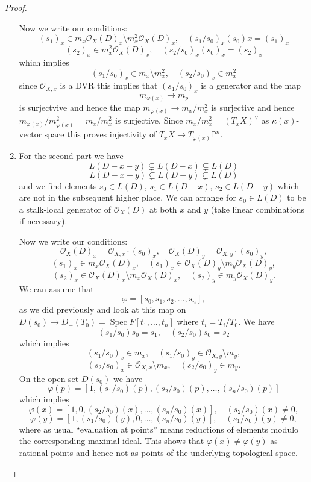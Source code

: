 \documentclass[12pt]{article}
\numberwithin{equation}{section}
\theoremstyle{definition}
\theoremstyle{remark}
\newcommand{\Ocal}{\mathcal{O}}
\newcommand{\PP}{\mathbb{P}}
\newcommand{\Spec}{\operatorname{Spec}}
\begin{document}
\begin{proof}
\begin{enumerate}
Now we write our conditions:
$$ (s_1)_x \in m_x \Ocal_X(D)_x\setminus m_x^2 \Ocal_X(D)_x, \quad (s_1/s_0)_x (s_0)x = (s_1)_x $$
$$ (s_2)_x \in m_x^2 \Ocal_X(D)_x, \quad (s_2/s_0)_x (s_0)_x = (s_2)_x $$
which implies 
 $$ (s_1/s_0)_x \in m_x\setminus m_x^2, \quad (s_2/s_0)_x \in m_x^2 $$
since $\Ocal_{X,x}$ is a DVR this implies that $(s_1/s_0)_x$ is a generator and the map 
 $$ m_{\varphi(x)} \to m_p $$
is surjectvive and hence the map $m_{\varphi(x)} \to m_x/m_x^2$ is surjective and hence $m_{\varphi(x)}/m_{\varphi(x)}^2 = m_x/m_x^2$ is surjective.
Since $m_x/m_x^2 = (T_xX)^{\vee}$ as $\kappa(x)$-vector space this proves injectivity of $T_xX \to T_{\varphi(x)}\PP^n$.
\item For the second part we have 
 $$ L(D-x-y) \subsetneq L(D-x) \subsetneq L(D) $$
 $$L(D-x-y) \subsetneq L(D-y) \subsetneq L(D) $$
 and we find elements $s_0 \in L(D)$, $s_1\in L(D-x)$, $s_2 \in L(D-y)$ which are not in the subsequent higher place. 
 We can arrange for $s_0\in L(D)$ to be a stalk-local generator of $\Ocal_X(D)$ at both $x$ and $y$ (take linear combinations if necessary).

Now we write our conditions:
  $$ \Ocal_X(D)_x = \Ocal_{X,x}\cdot (s_0)_x, \quad \Ocal_X(D)_y = \Ocal_{X,y}\cdot (s_0)_y, $$
  $$ (s_1)_x \in m_x \Ocal_X(D)_x, \quad (s_1)_x \in \Ocal_X(D)_y\setminus m_y \Ocal_X(D)_y,$$
  $$ (s_2)_x \in \Ocal_X(D)_x \setminus m_x \Ocal_X(D)_x, \quad (s_2)_y \in m_y \Ocal_X(D)_y. $$
We can assume that 
 $$ \varphi= [s_0,s_1,s_2,\ldots,s_n], $$
as we did previously and look at this map on $D(s_0) \to D_+(T_0) = \Spec F[t_1,\ldots,t_n]$ where $t_i = T_i/T_0$.
We have 
 $$ (s_1/s_0) s_0 = s_1, \quad (s_2/s_0) s_0 = s_2 $$
which implies
 $$ (s_1/s_0)_x \in m_x, \quad (s_1/s_0)_y \in \Ocal_{X,y}\setminus m_y, $$
 $$ (s_2/s_0)_x \in \Ocal_{X,x}\setminus m_x, \quad (s_2/s_0)_y \in m_y. $$
On the open set $D(s_0)$ we have
 $$ \varphi(p) = [1, (s_1/s_0)(p), (s_2/s_0)(p),\ldots, (s_n/s_0)(p) ] $$
which implies 
 $$ \varphi(x) = [1, 0, (s_2/s_0)(x), \ldots, (s_n/s_0)(x) ], \quad (s_2/s_0)(x)\neq 0, $$
 $$ \varphi(y) = [1, (s_1/s_0)(y), 0, \ldots, (s_n/s_0)(y) ], \quad (s_1/s_0)(y)\neq 0, $$
where as usual ``evaluation at points'' means reductions of elements modulo the corresponding maximal ideal. 
This shows that $\varphi(x)\neq \varphi(y)$ as rational points and hence not as points of the underlying topological space.
\end{enumerate}
\end{proof}
\end{document}
